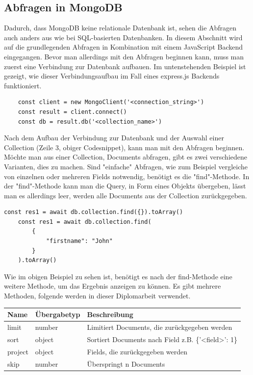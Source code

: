 \subsection{Abfragen in MongoDB}
Dadurch, dass MongoDB keine relationale Datenbank ist, sehen die Abfragen auch anders aus wie bei SQL-basierten Datenbanken. In diesem Abschnitt wird auf die grundlegenden Abfragen in Kombination mit einem JavaScript Backend eingegangen. Bevor man allerdings mit den Abfragen beginnen kann, muss man zuerst eine Verbindung zur Datenbank aufbauen. Im untenstehenden Beispiel ist gezeigt, wie dieser Verbindungsaufbau im Fall eines express.js Backends funktioniert.
\begin{lstlisting}
    const client = new MongoClient('<connection_string>')
    const result = client.connect()
    const db = result.db('<collection_name>')
\end{lstlisting}
Nach dem Aufbau der Verbindung zur Datenbank und der Auswahl einer Collection (Zeile 3, obiger Codesnippet), kann man mit den Abfragen beginnen.
\newline
Möchte man aus einer Collection, Documents abfragen, gibt es zwei verschiedene Varianten, dies zu machen. Sind "einfache" Abfragen, wie zum Beispiel vergleiche von einzelnen oder mehreren Fields notwendig, benötigt es die "find"-Methode. In der "find"-Methode kann man die Query, in Form eines Objekts übergeben, lässt man es allerdings leer, werden alle Documents aus der Collection zurückgegeben.
\begin{lstlisting}[caption=Simple Abfrage in MongoDB]
    const res1 = await db.collection.find({}).toArray()
    const res1 = await db.collection.find(
        {
            "firstname": "John"
        }
    ).toArray()
\end{lstlisting}
Wie im obigen Beispiel zu sehen ist, benötigt es nach der find-Methode eine weitere Methode, um das Ergebnis anzeigen zu können. Es gibt mehrere Methoden, folgende werden in dieser Diplomarbeit verwendet.
\begin{center}
    \begin{tabular}{ | m{3cm} | m{2.3cm}| m{8cm} | } 
        \hline
        Name & Übergabetyp & Beschreibung \\ [0.5ex] 
        \hline\hline
        limit & number & Limitiert Documents, die zurückgegeben werden \\
        \hline
        sort & object & Sortiert Documents nach Field z.B. \{'<field>': 1\} \\
        \hline
        project & object & Fields, die zurückgegeben werden \\
        \hline
        skip & number & Überspringt n Documents \\
        \hline
    \end{tabular}
\end{center}

